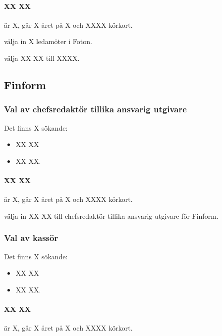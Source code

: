 \documentclass[hidelinks]{sektionsmote}
\begin{document}
\paragraph{XX XX} är X, går X året på X och XXXX körkort.

\begin{beslut}
  \item välja in X ledamöter i Foton.
\end{beslut}
\begin{beslut}
  \item välja XX XX till XXXX.
\end{beslut}


\subsection{Finform}
\subsubsection{Val av chefsredaktör tillika ansvarig utgivare}
Det finns X sökande:
\begin{itemize}
    \item XX XX
    \item XX XX.
\end{itemize}

\paragraph{XX XX} är X, går X året på X och XXXX körkort.

\begin{beslut}
  \item välja in XX XX till chefsredaktör tillika ansvarig utgivare för Finform.
\end{beslut}


\subsubsection{Val av kassör}
Det finns X sökande:
\begin{itemize}
    \item XX XX
    \item XX XX.
\end{itemize}

\paragraph{XX XX} är X, går X året på X och XXXX körkort.
\end{document}

